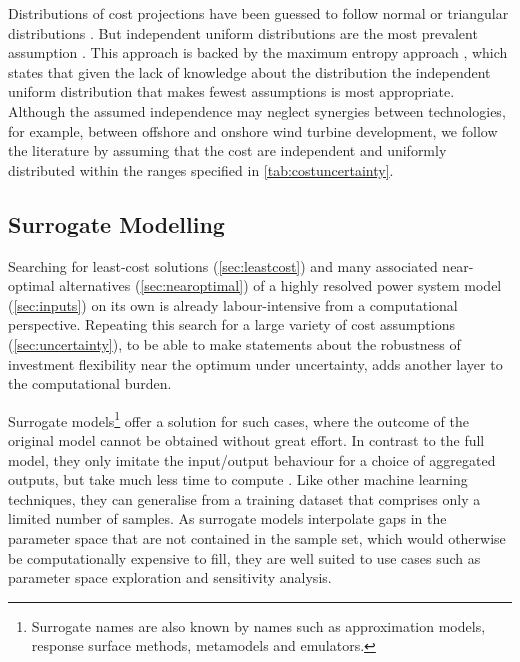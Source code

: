 Distributions of cost projections have been guessed
to follow normal \cite{mavromatidis_uncertainty_2018} or triangular distributions \cite{li_using_2020}.
But independent uniform distributions are the most prevalent assumption \cite{moret_characterization_2017,moret_robust_2016,shirizadeh_how_2019,trondle_trade-offs_2020,pilpola_analyzing_2020,Li2017,Trutnevyte2013,lopion_cost_2019}.
This approach is backed by the maximum entropy approach \cite{trondle_trade-offs_2020}, which states that given the lack of knowledge about the distribution
the independent uniform distribution that makes fewest assumptions is most appropriate.
Although the assumed independence may neglect synergies between technologies,
for example, between offshore and onshore wind turbine development,
we follow the literature by assuming that the cost are independent and uniformly distributed within the ranges specified in \cref{tab:costuncertainty}.

\subsection{Surrogate Modelling}
\label{sec:surrogate}


Searching for least-cost solutions (\cref{sec:leastcost}) and many associated near-optimal alternatives (\cref{sec:nearoptimal}) of a highly resolved power system model (\cref{sec:inputs}) on its own
is already labour-intensive from a computational perspective.
Repeating this search for a large variety of cost assumptions (\cref{sec:uncertainty}), 
to be able to make statements about the robustness of
investment flexibility near the optimum under uncertainty,
adds another layer to the computational burden.


Surrogate models\footnote{Surrogate names are also known by names such as approximation models, response surface methods, metamodels and emulators.}
offer a solution for such cases, where the outcome of the
original model cannot be obtained without great effort.
In contrast to the full model, they only imitate the input/output behaviour for a choice of aggregated outputs, but take much less time to compute \cite{palar_multi-fidelity_2016}.
Like other machine learning techniques, they can generalise from a
training dataset that comprises only a limited number of samples.
As surrogate models interpolate gaps in the parameter space that are not contained in the sample set,
which would otherwise be computationally expensive to fill,
they are well suited to use cases such as parameter space exploration and sensitivity analysis.

